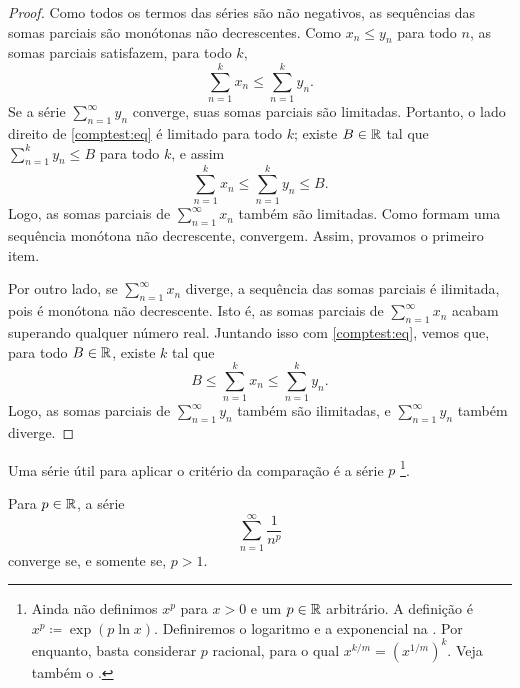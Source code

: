 \begin{proof}
Como todos os termos das séries são não negativos, as sequências das
somas parciais são monótonas não decrescentes.
Como $x_n \leq y_n$ para todo $n$, as somas parciais satisfazem, para todo $k$,
\begin{equation} \label{comptest:eq}
\sum_{n=1}^k x_n \leq \sum_{n=1}^k y_n .
\end{equation}
Se a série $\sum_{n=1}^\infty y_n$ converge, suas somas parciais são
limitadas. Portanto, o lado direito de \eqref{comptest:eq}
é limitado para todo $k$; existe $B \in {\mathbb{R}}$ tal que
$\sum_{n=1}^k y_n \leq B$ para todo $k$, e assim
\begin{equation*}
\sum_{n=1}^k x_n \leq \sum_{n=1}^k y_n \leq B.
\end{equation*}
Logo, as somas parciais de $\sum_{n=1}^\infty x_n$
também são limitadas. Como formam uma sequência monótona não decrescente,
convergem. Assim, provamos o primeiro item.

Por outro lado, se $\sum_{n=1}^\infty x_n$ diverge, a sequência das somas parciais
é ilimitada, pois é monótona não decrescente. Isto é, as somas
parciais de $\sum_{n=1}^\infty x_n$ acabam superando qualquer número real. Juntando isso
com \eqref{comptest:eq}, vemos que, para todo $B \in
{\mathbb{R}}$, existe $k$ tal que 
\begin{equation*}
B \leq \sum_{n=1}^k x_n \leq \sum_{n=1}^k y_n .
\end{equation*}
Logo, as somas parciais de $\sum_{n=1}^\infty y_n$ também são ilimitadas, e
$\sum_{n=1}^\infty y_n$ também diverge.
\end{proof}

Uma série útil para aplicar o critério da comparação é a
série $p$%
\footnote{Ainda não definimos $x^p$ para $x > 0$ e
um $p \in {\mathbb{R}}$ arbitrário. A definição é $x^p \coloneqq \exp ( p \ln x )$.
Definiremos o logaritmo e a exponencial na .
Por enquanto, basta considerar $p$ racional,
para o qual $x^{k/m} = {(x^{1/m})}^{k}$. Veja também o .}.

\begin{prop}%
Para $p \in {\mathbb{R}}$,
a série
\begin{equation*}
\sum_{n=1}^\infty \frac{1}{n^p}
\end{equation*}
converge se, e somente se, $p > 1$.
\end{prop}

